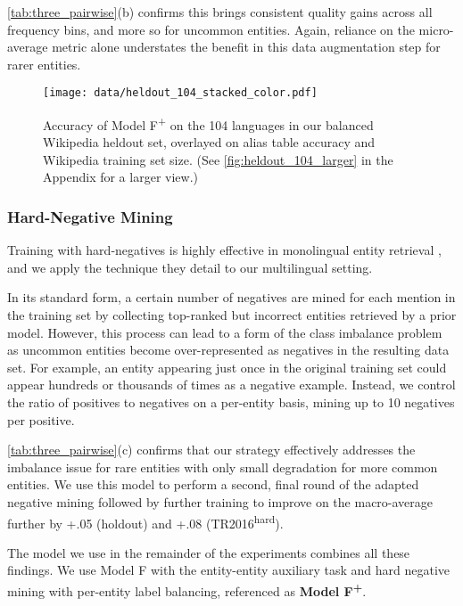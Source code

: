 \documentclass[11pt,a4paper]{article}
\newcommand*{\TR}{TR2016\textsuperscript{hard}}
\begin{document}
\autoref{tab:three_pairwise}(b) confirms this brings consistent quality gains across all frequency bins, and more so for uncommon entities. Again, reliance on the micro-average metric alone understates the benefit in this data augmentation step for rarer entities.

\begin{figure*}
  \centering
  \texttt{[image: data/heldout\_104\_stacked\_color.pdf]}
\vspace{-2.8em}
  \caption{Accuracy of Model F\textsuperscript{+} on the 104 languages in our balanced Wikipedia heldout set, overlayed on alias table accuracy and Wikipedia training set size. (See \autoref{fig:heldout_104_larger} in the Appendix for a larger view.)
  \label{fig:heldout_104}}
\end{figure*}

\subsubsection{Hard-Negative Mining}
Training with hard-negatives is highly effective in monolingual entity retrieval
\citep{gillick-etal-2019-learning}, and we apply the technique they detail to our multilingual setting.

In its standard form, a certain number of negatives are mined for each mention in the training set by collecting top-ranked but incorrect entities retrieved by a prior model.
However, this process can lead to a form of the class imbalance problem as uncommon entities become over-represented as negatives in the resulting data set.
For example, an entity appearing just once in the original training set could appear hundreds or thousands of times as a negative example.
Instead, we control the ratio of positives to negatives on a per-entity basis, mining up to 10 negatives per positive.

\autoref{tab:three_pairwise}(c)
confirms that our strategy effectively addresses the imbalance issue for rare entities with only small degradation for more common entities.
We use this model to perform a second, final round
of the adapted negative mining followed by further training to improve on the macro-average further by +.05 (holdout) and +.08 (\TR{}).

The model we use in the remainder of the experiments combines all these findings. We use Model F with the entity-entity auxiliary task and hard negative mining with per-entity label balancing, referenced as
\textbf{Model F\textsuperscript{+}}.
\end{document}
